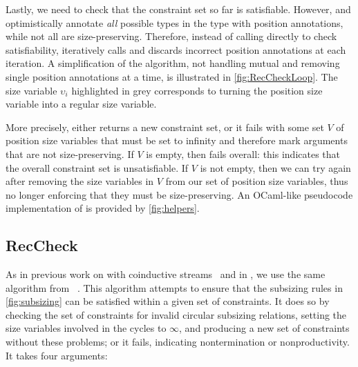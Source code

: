 


Lastly, we need to check that the constraint set so far is satisfiable.
However, \setrecstars and \setcorecstars optimistically annotate \textit{all} possible \coinductive types in the \cofixpoint type with position annotations, while not all \cofixpoints are size-preserving.
Therefore, instead of calling \RecCheck directly to check satisfiability,
\RecCheckLoop iteratively calls \RecCheck and discards incorrect position annotations at each iteration.
A simplification of the algorithm, not handling mutual \cofixpoints and removing single position annotations at a time,
is illustrated in \autoref{fig:RecCheckLoop}.
The size variable $\upsilon_i$ highlighted in grey corresponds to turning the position size variable into a regular size variable.

More precisely, \RecCheck either returns a new constraint set,
or it fails with some set $V$ of position size variables that must be set to infinity
and therefore mark arguments that are not size-preserving.
If $V$ is empty, then \RecCheckLoop fails overall: this indicates that the overall constraint set is unsatisfiable.
If $V$ is not empty, then we can try \RecCheck again after removing the size variables in $V$ from our set of position size variables,
thus no longer enforcing that they must be size-preserving.
An OCaml-like pseudocode implementation of \RecCheckLoop is provided by \autoref{fig:helpers}.

\subsection{RecCheck}\label{sec:algorithm:reccheck}

As in previous work on \CChatomega with coinductive streams~\citep{cc-hat-omega} and in \CIChat, we use the same \RecCheck algorithm from \Fhat~\citep{f-hat}.
This algorithm attempts to ensure that the subsizing rules in \autoref{fig:subsizing} can be satisfied within a given set of constraints.
It does so by checking the set of constraints for invalid circular subsizing relations, setting the size variables involved in the cycles to $\infty$, and producing a new set of constraints without these problems; or it fails, indicating nontermination or nonproductivity.
It takes four arguments:

